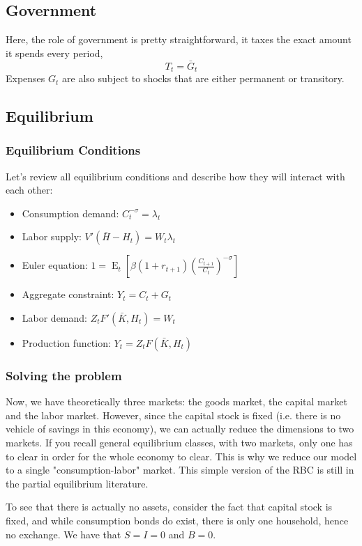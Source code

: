 \documentclass[12pt]{report}
\newcommand{\Et}[1]{\operatorname{E}_t\left[#1\right]}
\begin{document}
\subsection{Government}

Here, the role of government is pretty straightforward, it taxes the exact amount it spends every period, $$T_t = \bar G_t$$
Expenses $G_t$ are also subject to shocks that are either permanent or transitory. 

\subsection{Equilibrium}

\subsubsection{Equilibrium Conditions}

Let's review all equilibrium conditions and describe how they will interact with each other:\begin{itemize}
\item Consumption demand: $C_t^{-\sigma} = \lambda_t$
\item Labor supply: $V'(\bar H - H_t) = W_t \lambda_t$
\item Euler equation: $1 = \Et{\beta(1+r_{t+1})\left(\frac{C_{t+1}}{C_t}\right)^{-\sigma}} $ 
\item Aggregate constraint: $Y_t = C_t + G_t$
\item Labor demand: $Z_t F'(\bar K, H_{t}) = W_t$
\item Production function: $Y_t = Z_t F(\bar K, H_t)$
\end{itemize}

\subsubsection{Solving the problem}

Now, we have theoretically three markets: the goods market, the capital market and the labor market. However, since the capital stock is fixed (i.e. there is no vehicle of savings in this economy), we can actually reduce the dimensions to two markets. If you recall general equilibrium classes, with two markets, only one has to clear in order for the whole economy to clear. This is why we reduce our model to a single "consumption-labor" market. This simple version of the RBC is still in the partial equilibrium literature.

To see that there is actually no assets, consider the fact that capital stock is fixed, and while consumption bonds do exist, there is only one household, hence no exchange. We have that $S = I = 0$ and $B = 0$.
\end{document}
